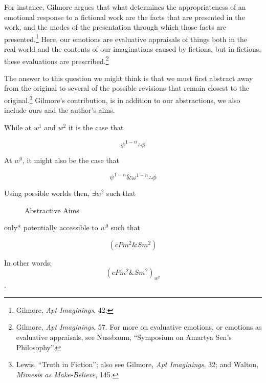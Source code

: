 \documentclass[phdthesis,12pt,final,a4paper]{wuthesis}
\theoremstyle{definition}
\theoremstyle{definition}
\theoremstyle{definition}
\theoremstyle{definition}
\theoremstyle{remark}
\begin{document}
For instance, Gilmore argues that what determines the appropriateness of an emotional response to a fictional work are the facts that are presented in the work, and the modes of the presentation through which those facts are presented.\footnote{Gilmore, \emph{Apt {Imaginings}}, 42.} Here, our emotions are evaluative appraisals of things both in the real-world and the contents of our imaginations caused by fictions, but in fictions, these evaluations are prescribed.\footnote{Gilmore, \emph{Apt {Imaginings}}, 57. For more on evaluative emotions, or emotions as evaluative appraisals, see Nussbaum, {``Symposium on {Amartya Sen}'s Philosophy''}.}

\noindent The answer to this question we might think is that we must first abstract away from the original to several of the possible revisions that remain closest to the original.\footnote{Lewis, {``Truth in {Fiction}''}; also see Gilmore, \emph{Apt {Imaginings}}, 32; and Walton, \emph{Mimesis as {Make-Believe}}, 145.} Gilmore's contribution, is in addition to our abstractions, we also include ours and the author's aims.

While at \(w^{1}\) and \(w^{2}\) it is the case that

\[\psi^{1-n}\therefore\phi\]

\noindent At \(w^{0}\), it might also be the case that

\[\psi^{1-n}\&\omega^{1-n}\therefore\phi\]

\newpage

\noindent Using possible worlds then, \(\exists w^{2}\) such that

\begin{figure}
\centering
{}
\caption{Abstractive Aims}
\label{fig:abstractive-aims}
\end{figure}

\noindent *only* potentially accessible to \(w^{0}\) such that

\[( cPm^{2} \& Sm^{2} )\]

\noindent In other words; \[( cPm^{2} \& Sm^{2} )_{w^{2}}\].
\end{document}

